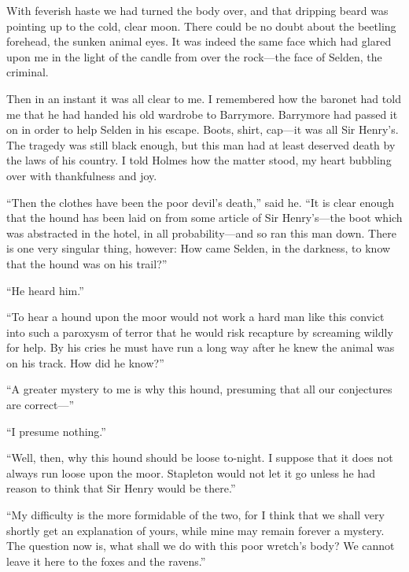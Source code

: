 \documentclass[paper=a5,BCOR=7mm,twoside,DIV=calc,12pt,usegeometry,openany,chapterprefix,endperiod,headings=big]{scrbook} %
\begin{document}
With feverish haste we had turned the body over, and that dripping beard was pointing up to the cold, clear moon. There could be no doubt about the beetling forehead, the sunken animal eyes. It was indeed the same face which had glared upon me in the light of the candle from over the rock---the face of Selden, the criminal.


Then in an instant it was all clear to me. I remembered how the baronet had told me that he had handed his old wardrobe to Barrymore. Barrymore had passed it on in order to help Selden in his escape. Boots, shirt, cap---it was all Sir Henry's. The tragedy was still black enough, but this man had at least deserved death by the laws of his country. I told Holmes how the matter stood, my heart bubbling over with thankfulness and joy.

\enquote{Then the clothes have been the poor devil's death,} said he. \enquote{It is clear enough that the hound has been laid on from some article of Sir Henry's---the boot which was abstracted in the hotel, in all probability---and so ran this man down. There is one very singular thing, however: How came Selden, in the darkness, to know that the hound was on his trail?}

\enquote{He heard him.}

\enquote{To hear a hound upon the moor would not work a hard man like this convict into such a paroxysm of terror that he would risk recapture by screaming wildly for help. By his cries he must have run a long way after he knew the animal was on his track. How did he know?}

\enquote{A greater mystery to me is why this hound, presuming that all our conjectures are correct---}

\enquote{I presume nothing.}

\enquote{Well, then, why this hound should be loose to-night. I suppose that it does not always run loose upon the moor. Stapleton would not let it go unless he had reason to think that Sir Henry would be there.}

\enquote{My difficulty is the more formidable of the two, for I think that we shall very shortly get an explanation of yours, while mine may remain forever a mystery. The question now is, what shall we do with this poor wretch's body? We cannot leave it here to the foxes and the ravens.}
\end{document}
